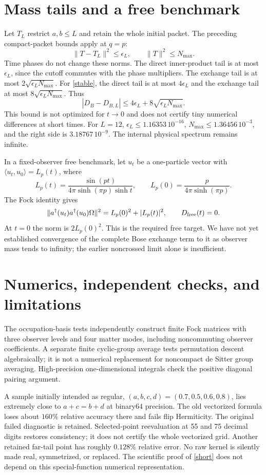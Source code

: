 \documentclass[11pt,a4paper]{article}
\begin{document}
\section{Mass tails and a free benchmark}
Let $T_L$ restrict $a,b\le L$ and retain the whole initial packet.
The preceding compact-packet bounds apply at $q=p$:
\[
 \|T-T_L\|^2\le\epsilon_L,\qquad \|T\|^2\le N_{\max}.
\]
Time phases do not change these norms.
The direct inner-product tail is at most $\epsilon_L$, since the
cutoff commutes with the phase multipliers.
The exchange tail is at most $2\sqrt{\epsilon_LN_{\max}}$.
For \eqref{stable}, the direct tail is at most $4\epsilon_L$ and the
exchange tail at most $8\sqrt{\epsilon_LN_{\max}}$. Thus
\begin{equation}
 |D_B-D_{B,L}|
 \le4\epsilon_L+8\sqrt{\epsilon_LN_{\max}} .
\end{equation}
This bound is not optimized for $t\to0$ and does not certify tiny
numerical differences at short times.
For $L=12$,
$\epsilon_L\le1.16353\,10^{-16}$,
$N_{\max}\le1.36456\,10^{-3}$, and the right side is
$3.18767\,10^{-9}$. The internal physical spectrum remains infinite.

In a fixed-observer free benchmark, let $u_t$ be a one-particle vector
with $\langle u_t,u_0\rangle=L_p(t)$, where
\[
 L_p(t)=\frac{\sin(pt)}{4\pi\sinh(\pi p)\sinh t},\qquad
 L_p(0)=\frac{p}{4\pi\sinh(\pi p)}.
\]
The Fock identity gives
\[
 \|a^\dagger(u_t)a^\dagger(u_0)\Omega\|^2
 =L_p(0)^2+|L_p(t)|^2,\qquad D_{\rm free}(t)=0.
\]
At $t=0$ the norm is $2L_p(0)^2$.
This is the required free target. We have not yet established convergence
of the complete Bose exchange term to it as observer mass tends to
infinity; the earlier noncrossed limit alone is insufficient.

\section{Numerics, independent checks, and limitations}

The occupation-basis tests independently construct finite Fock matrices
with three observer levels and four matter modes, including
noncommuting observer coefficients. A separate finite cyclic-group
average tests permutation descent algebraically; it is not a numerical
replacement for noncompact de Sitter group averaging.
High-precision one-dimensional integrals check the positive diagonal
pairing argument.

A sample initially intended as regular, $(a,b,c,d)=(0.7,0.5,0.6,0.8)$, lies
extremely close to $a+c=b+d$ at binary64 precision.
The old vectorized formula loses about $160\%$ relative accuracy there
and fails flip Hermiticity. The original failed diagnostic is retained.
Selected-point reevaluation at 55 and 75 decimal digits restores
consistency; it does not certify the whole vectorized grid.
Another retained far-tail point has roughly $0.128\%$ relative error.
No raw kernel is silently made real, symmetrized, or replaced.
The scientific proof of \eqref{short} does not depend on this
special-function numerical representation.
\end{document}
